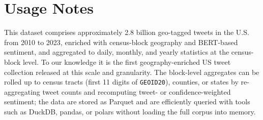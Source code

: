 \documentclass[fleqn,10pt]{wlscirep}
\begin{document}
\section*{Usage Notes}



This dataset comprises approximately 2.8 billion geo-tagged tweets in the U.S. from 2010 to 2023, enriched with census-block geography and BERT-based sentiment, and aggregated to daily, monthly, and yearly statistics at the census-block level. To our knowledge it is the first geography-enriched US tweet collection released at this scale and granularity. The block-level aggregates can be rolled up to census tracts (first 11 digits of \texttt{GEOID20}), counties, or states by re-aggregating tweet counts and recomputing tweet- or confidence-weighted sentiment; the data are stored as Parquet and are efficiently queried with tools such as DuckDB, pandas, or polars without loading the full corpus into memory.
\end{document}
